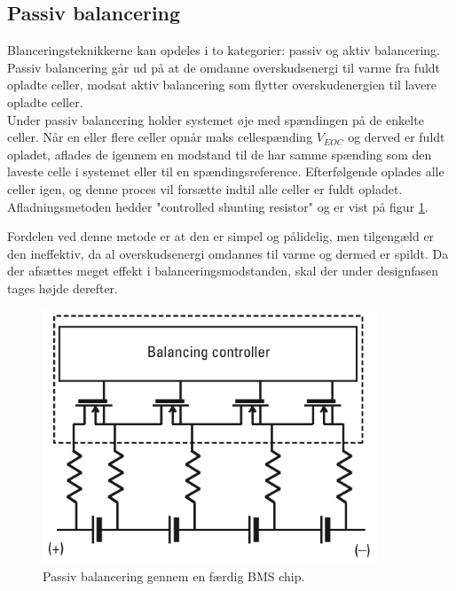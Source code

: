 \subsection{Passiv balancering}
Blanceringsteknikkerne kan opdeles i to kategorier: passiv og aktiv balancering. Passiv balancering går ud på at de omdanne overskudsenergi til varme fra fuldt opladte celler, modsat aktiv balancering som flytter overskudenergien til lavere opladte celler.
\\

Under passiv balancering holder systemet øje med spændingen på de enkelte celler. Når en eller flere celler opnår maks cellespænding $V_{EOC}$ og derved er fuldt opladet, aflades de igennem en modstand til de har samme spænding som den laveste celle i systemet eller til en spændingsreference. Efterfølgende oplades alle celler igen, og denne proces vil forsætte indtil alle celler er fuldt opladet. Afladningsmetoden hedder "controlled shunting resistor" og er vist på figur \ref{fig:passiv_balancering_teknik}. 



Fordelen ved denne metode er at den er simpel og pålidelig, men tilgengæld er den ineffektiv, da al overskudsenergi omdannes til varme og dermed er spildt. Da der afsættes meget effekt i balanceringsmodstanden, skal der under designfasen tages højde derefter.

\begin{figure}[h]
	\centering
	\includegraphics[width=10cm]{billeder/passiv_balancering.png}
	\caption{Passiv balancering gennem en færdig BMS chip.}
	\label{fig:passiv_balancering_teknik}
\end{figure}


